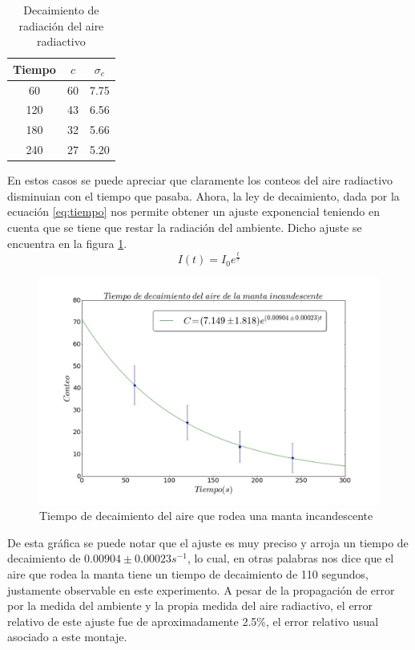 \documentclass[%
 reprint,
 amsmath,amssymb,
 aps,
]{revtex4-1}
\begin{document}
\begin{table}[h!]
\centering
 \begin{tabular}{|c|c|c|} 
 \hline
 Tiempo & $c$ & $\sigma_c$\\ [0.5ex] 
 \hline\hline
 60&60&7.75\\
 120&43&6.56\\
 180&32&5.66\\
 240&27&5.20\\
[1ex] 
 \hline
 \end{tabular}
 \caption{Decaimiento de radiación del aire radiactivo}
 \label{table:decaire}
\end{table}

En estos casos se puede apreciar que claramente los conteos del aire radiactivo disminuian con el tiempo que pasaba. Ahora, la ley de decaimiento, dada por la ecuación \ref{eq:tiempo} nos permite obtener un ajuste exponencial teniendo en cuenta que se tiene que restar la radiación del ambiente. Dicho ajuste se encuentra en la figura \ref{fig:deca}.\\

\begin{equation}
I(t) = I_0 e^{\frac{t}{\tau}}
\label{eq:tiempo}
\end{equation}

\begin{figure}[h!]
\centering
\includegraphics[width=1.1\linewidth]{decaimiento.jpg}
\caption{Tiempo de decaimiento del aire que rodea una manta incandescente}
\label{fig:deca}
\end{figure}

De esta gráfica se puede notar que el ajuste es muy preciso y arroja un tiempo de decaimiento de $0.00904\pm0.00023s^{-1}$, lo cual, en otras palabras nos dice que el aire que rodea la manta tiene un tiempo de decaimiento de 110 segundos, justamente observable en este experimento. A pesar de la propagación de error por la medida del ambiente y la propia medida del aire radiactivo, el error relativo de este ajuste fue de aproximadamente 2.5\%, el error relativo usual asociado a este montaje.\\
\end{document}
